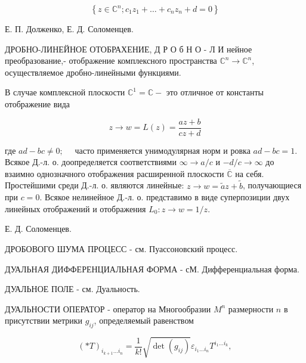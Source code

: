 \documentclass[10pt]{article}
\begin{document}
\[

\left\{z \in \mathbb{C}^{n} ; c_{1} z_{1}+\ldots+c_{n} z_{n}+d=0\right\}

\]



Е. П. Долженко, Е. Д. Соломенцев.



ДРОБНО-ЛИНЕЙНОЕ ОТОБРАХЕНИЕ, Д Р О б Н О - Л И нейное преобразование,- отображение комплексного пространства $\mathbb{C}^{n} \rightarrow \mathbb{C}^{n}$, осуществляемое дробно-линейными функциями.



В случае комплексной плоскости $\mathbb{C}^{1}=\mathbb{C}-$ это отличное от константы отображение вида



\[

z \rightarrow w=L(z)=\frac{a z+b}{c z+d}

\]



где $a d-b c \neq 0 ; \quad$ часто применяется унимодулярная норм и ровка $a d-b c=1$. Всякое Д.-л. о. доопределяется соответствиями $\infty \rightarrow a / c$ и $-d / c \rightarrow \infty$ до взаимно однозначного отображения расширенной плоскости $\overline{\mathbb{C}}$ на себя. Простейшими среди Д.-л. о. являются линейные: $z \rightarrow w=\tilde{a} z+\tilde{b}$, получающиеся при $c=0$. Всякое нелинейное Д.-л. о. представимо в виде суперпозиции двух линейных отображений и отображения $L_{0}: z \rightarrow w=1 / z$.



Е. Д. Соломенцев.



ДРОБОВОГО ШУМА ПРОЦЕСС - см. Пуассоновский процесс.



ДУАЛЬНАЯ ДИФФЕРЕНЦИАЛЬНАЯ ФОРМА - сМ. Дифференциальная форма.



ДУАЛЬНОЕ ПОЛЕ - см. Дуальность.



ДУАЛЬНОСТИ ОПЕРАТОР - оператор на Многообразии $M^{n}$ размерности $n$ в присутствии метрики $g_{i j}$, определяемый равенством



\[

(* T)_{i_{k+1} \ldots i_{n}}=\frac{1}{k !} \sqrt{\operatorname{det}\left(g_{i j}\right)} \varepsilon_{i_{1} \ldots i_{n}} T^{i_{1} \ldots i_{k}},

\]
\end{document}
